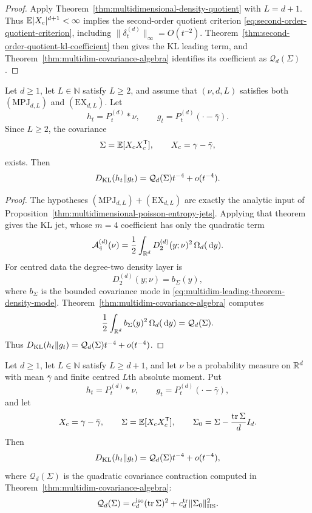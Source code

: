 \begin{proof}
Apply Theorem~\ref{thm:multidimensional-density-quotient} with
\(L=d+1\).  Thus \(\mathbb{E}|X_c|^{d+1}<\infty\) implies the second-order quotient criterion
\eqref{eq:second-order-quotient-criterion}, including
\(\|\delta_t^{(d)}\|_\infty=O(t^{-2})\).  Theorem~\ref{thm:second-order-quotient-kl-coefficient}
then gives the KL leading term, and
Theorem~\ref{thm:multidim-covariance-algebra} identifies its
coefficient as \(\mathcal Q_d(\Sigma)\).
\end{proof}

\begin{corollary}%
\label{cor:multidim-leading-kl-coefficient}
Let \(d\ge1\), let \(L\in\mathbb N\) satisfy \(L\ge2\), and assume that
\((\nu,d,L)\) satisfies both \((\mathrm{MPJ}_{d,L})\) and
\((\mathrm{EX}_{d,L})\).  Let
\[
h_t=P_t^{(d)}*\nu,\qquad
g_t=P_t^{(d)}(\cdot-\bar{\gamma}).
\]
Since \(L\ge2\), the covariance
\[
\Sigma=\mathbb{E}[X_cX_c^{\mathsf T}],\qquad X_c=\gamma-\bar{\gamma},
\]
exists.  Then
\[
D_{\rm KL}(h_t\|g_t)
=\mathcal Q_d(\Sigma)t^{-4}+o(t^{-4}).
\]
\end{corollary}

\begin{proof}
The hypotheses \((\mathrm{MPJ}_{d,L})+(\mathrm{EX}_{d,L})\) are exactly the
analytic input of Proposition~\ref{thm:multidimensional-poisson-entropy-jets}.
Applying that theorem gives the KL jet, whose \(m=4\) coefficient has only the quadratic
term
\[
\mathcal A_4^{(d)}(\nu)
=\frac12\int_{\mathbb{R}^d}D_2^{(d)}(y;\nu)^2\,\Omega_d(\,\mathrm{d} y).
\]
For centred data the degree-two density layer is
\[
D_2^{(d)}(y;\nu)=b_\Sigma(y),
\]
where \(b_\Sigma\) is the bounded covariance mode in
\eqref{eq:multidim-leading-theorem-density-mode}.  Theorem~\ref{thm:multidim-covariance-algebra}
computes
\[
\frac12\int_{\mathbb{R}^d}b_\Sigma(y)^2\,\Omega_d(\,\mathrm{d} y)=\mathcal Q_d(\Sigma).
\]
Thus \(D_{\rm KL}(h_t\|g_t)=\mathcal Q_d(\Sigma)t^{-4}+o(t^{-4})\).
\end{proof}

\begin{corollary}%
\label{cor:multidim-finite-moment-covariance-coefficient}
Let \(d\ge1\), let \(L\in\mathbb N\) satisfy \(L\ge d+1\), and let \(\nu\) be
a probability measure on \(\mathbb{R}^d\) with mean \(\bar{\gamma}\) and finite
centred \(L\)th absolute moment.  Put
\[
h_t=P_t^{(d)}*\nu,\qquad
g_t=P_t^{(d)}(\cdot-\bar{\gamma}),
\]
and let
\[
X_c=\gamma-\bar{\gamma},\qquad
\Sigma=\mathbb{E}[X_cX_c^{\mathsf T}],\qquad
\Sigma_0=\Sigma-\frac{\operatorname{tr}\Sigma}{d}I_d .
\]
Then
\begin{equation}\label{eq:finite-moment-covariance-coefficient-through-mpj}
D_{\rm KL}(h_t\|g_t)=\mathcal Q_d(\Sigma)t^{-4}+o(t^{-4}),
\end{equation}
where \(\mathcal Q_d(\Sigma)\) is the quadratic covariance contraction computed
in Theorem~\ref{thm:multidim-covariance-algebra}:
\[
\mathcal Q_d(\Sigma)
=c_d^{\rm iso}(\operatorname{tr}\Sigma)^2
+c_d^{\rm tr}\|\Sigma_0\|_{\rm HS}^2 .
\]
\end{corollary}

